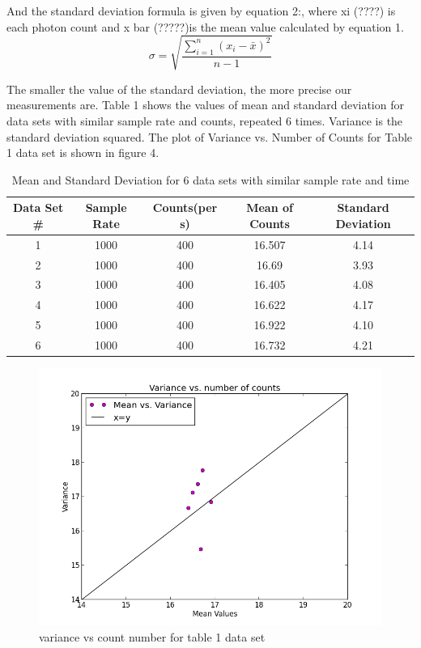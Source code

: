 \documentclass[letterpaper,12pt]{article}
\begin{document}
And the standard deviation formula is given by equation 2:, where xi   (????) is each photon count and x bar (?????)is the mean value calculated by equation 1. 
\begin{equation} \label{E:sd}
\sigma = \sqrt{\frac{\sum\limits_{i=1}^{n}
\left(x_{i} - \bar{x}\right)^{2}}
{n-1}}
\end{equation}

The smaller the value of the standard deviation, the more precise our measurements are. Table 1 shows the values of mean and standard deviation for data sets with similar sample rate and counts, repeated 6 times. Variance is the standard deviation squared. The plot of Variance vs. Number of Counts for Table 1 data set is shown in figure 4.

\begin{table}[ht]
\caption{Mean and Standard Deviation for 6 data sets with similar sample rate and time} %
\centering %
\begin{tabular}{c c c c c} %
\hline\hline %
Data Set \# & Sample Rate & Counts(per s) & Mean of Counts & Standard Deviation \\ [0.5ex] %
\hline %
1 & 1000 & 400 & 16.507 & 4.14\\ %
2 & 1000 & 400& 16.69  & 3.93\\
3 & 1000 & 400& 16.405  & 4.08\\
4 & 1000 & 400 & 16.622 & 4.17\\
5 & 1000 & 400 & 16.922 & 4.10\\ 
6 & 1000 & 400 & 16.732 & 4.21 \\ [1ex] %
\hline %
\end{tabular}
\label{table:nonlin} %
\end{table}

\begin{figure}
\centering
\includegraphics[scale=0.6]{variance-vs-count-number-400.png}
\caption{variance vs count number for table 1 data set}
\end{figure}
\end{document}
